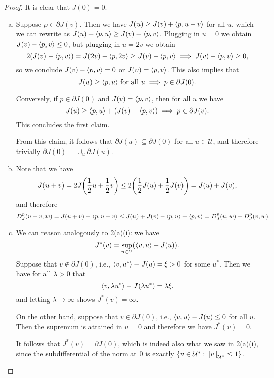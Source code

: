 \documentclass{article}
\theoremstyle{plain}
\theoremstyle{remark}
\newcommand{\Cal}{\mathcal}
\newcommand\UU{\Cal U}
\DeclarePairedDelimiter{\ang}{\langle}{\rangle}
\newcommand\pt\partial
\begin{document}
\begin{proof}
	It is clear that $J(0) = 0$. 
	\begin{enumerate}[(a)]
		\item Suppose $p \in \pt J(v)$. Then we have $J(u) \geq J(v) + \ang{p, u - v}$ for all $u$, which we can rewrite as $J(u) - \ang{p, u} \geq J(v) - \ang{p, v}$. Plugging in $u = 0$ we obtain $J(v) - \ang{p, v} \leq 0$, but plugging in $u = 2v$ we obtain
		\[
		2 \qty(J(v) - \ang{p, v}) = J(2v) - \ang{p, 2v} \geq J(v) - \ang{p, v} \implies J(v) - \ang{p, v} \geq 0, 
		\]
		so we conclude $J(v) - \ang{p, v} = 0$ or $J(v) = \ang{p, v}$. 	
		This also implies that
		\[
		J(u) \geq \ang{p, u} \text{ for all $u$} \implies p \in \pt J(0). 		
		\]
		
		Conversely, if $p \in \pt J(0)$ and $J(v) = \ang{p, v}$, then for all $u$ we have
		\[
		J(u) \geq \ang{p, u} + (J(v) - \ang{p, v}) \implies p \in \pt J(v).
		\]
		This concludes the first claim.
		
		From this claim, it follows that $\pt J(u) \subseteq \pt J(0)$ for all $u \in \UU$, and therefore trivially $\pt J(0) = \cup_u \pt J(u)$. 
		
		\item Note that we have
		\[
		J(u+v) = 2 J\qty(\frac12u + \frac12 v) \leq 2\qty(\frac12 J(u) + \frac12J(v)) = J(u) + J(v), 
		\]
		and therefore
		\[
		D_J^p(u+v, w) = J(u+v) - \ang{p, u +v} \leq J(u) + J(v) - \ang{p, u} - \ang{p, v} = D_J^p(u, w) + D_J^p(v, w). 
		\]
		
		\item We can reason analogously to 2(a)(i): we have
		\[
		J^*(v) = \sup_{u \in U} (\ang{v, u} - J(u)).
		\]
		Suppose that $v \notin \pt J(0)$, i.e., $\ang{v, u^*} - J(u) = \xi > 0$ for some $u^*$. Then we have for all $\lambda > 0$ that 
		\[
		\ang{v, \lambda u^*} - J(\lambda u^*) = \lambda \xi, 
		\]
		and letting $\lambda \to\infty$ shows $J^*(v) = \infty$. 
		
		On the other hand, suppose that $v \in \pt J(0)$, i.e., $\ang{v, u} - J(u) \leq 0$ for all $u$. Then the supremum is attained in $u = 0$ and therefore we have $J^*(v) = 0$. 
		
		It follows that $J^*(v) = \pt J(0)$, which is indeed also what we saw in 2(a)(i), since the subdifferential of the norm at 0 is exactly $\qty{v \in \UU^* : \norm{v}_{\UU^*} \leq 1}$. 
	\end{enumerate}
\end{proof}
\end{document}
